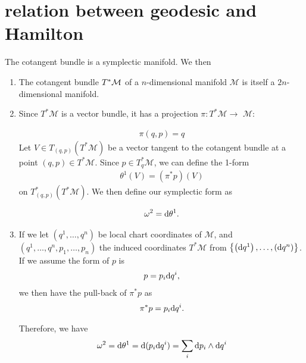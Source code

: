 \documentclass{article}
\begin{document}
\section{relation between geodesic and Hamilton}
The   cotangent bundle is a symplectic manifold. We then 
\begin{enumerate}
    \item {} The cotangent bundle $T^*\mathcal{M}$ of a $n$-dimensional manifold $\mathcal{M}$ is itself a $2 n$-dimensional manifold.
    \item {}
 Since $T^* \mathcal{M}$ is a vector bundle, it has a projection $\pi: T^* \mathcal{M} \to$ $\mathcal{M}$:
\bse
{}
\ese
\begin{align*}
    \pi(q,p) = q
\end{align*}
Let $V \in T_{(q, p)}\left(T^* \mathcal{M}\right)$ be a vector tangent to the cotangent bundle at a point $(q, p) \in T^* \mathcal{M}$. Since $p \in T_q^* \mathcal{M}$, we can define the 1-form
\begin{align*}
\theta^1(V)=\left(\pi^* p\right)(V)
\end{align*}
on $T^*_{(q, p)}\left(T^{*} \mathcal{M}\right)$. We then define our symplectic form as

\begin{align*}
\omega^2=\mathrm{d} \theta^1 .
\end{align*}
\item {}
If we let $\left(q^1, \ldots, q^n\right)$ be local chart coordinates of $\mathcal{M}$, and $\left(q^1, \ldots, q^n, p_1, \ldots, p_n\right)$ the induced coordinates $T^* \mathcal{M}$ from $\left\{\left(\mathrm{d} q^1\right),\ldots,\left(\mathrm{d} q^{n}\right)\right\}$. 
If we assume the form of $p$ is
\begin{align*}
    p= p_i \mathrm{d} q^i,
\end{align*}
we then have the pull-back of $\pi^* p$ as 
\begin{align*}
    \pi^* p = p_i \mathrm{d} q^i.
\end{align*}

Therefore, we have 
\begin{align*}
    \omega^2 = \mathrm{d} \theta^1 = \mathrm{d}(p_i \mathrm{d} q^i) = \sum_i \mathrm{d} p_i \wedge \mathrm{d} q^i
\end{align*}


\end{enumerate}
\end{document}
